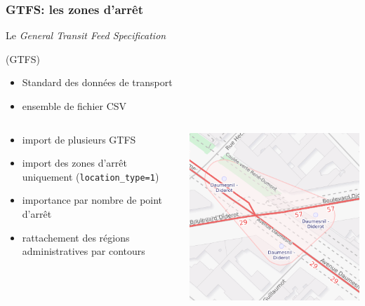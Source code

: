 \documentclass[table]{beamer}
\newcommand*{\foreign}[2][english]{%
    \emph{\foreignlanguage{#1}{#2}}%
}
\begin{document}
\begin{frame}
  \frametitle{GTFS: les zones d'arrêt}

  \begin{block}{Le \foreign{General Transit Feed Specification}
      (GTFS)}
    \begin{itemize}
    \item Standard des données de transport
    \item ensemble de fichier CSV
    \end{itemize}
  \end{block}

  \begin{columns}
    \begin{column}{.65\linewidth}
      \begin{itemize}
      \item import de plusieurs GTFS
      \item import des zones d'arrêt uniquement (\texttt{location\_type=1})
      \item importance par nombre de point d'arrêt
      \item rattachement des régions administratives par contours
      \end{itemize}
    \end{column}
    \begin{column}{.35\linewidth}
      \includegraphics[width=\textwidth]{images/stop-area}
    \end{column}
  \end{columns}

\end{frame}
\end{document}
